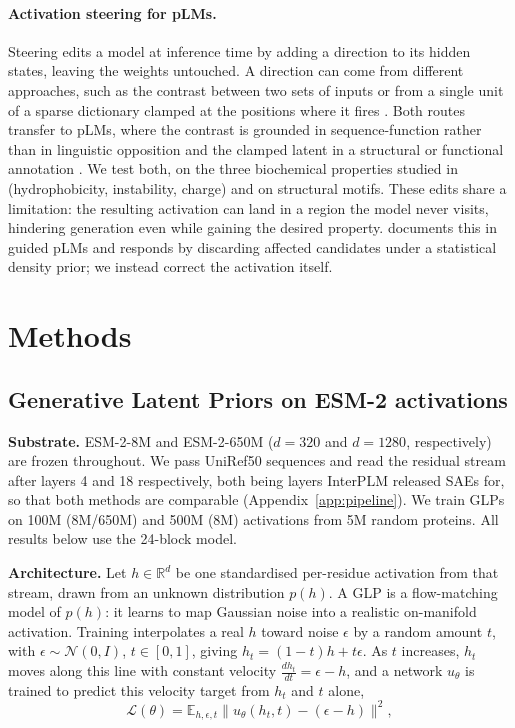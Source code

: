 \documentclass{article}
\begin{document}
\paragraph{Activation steering for pLMs.}
Steering edits a model at inference time by adding a direction to its hidden
states, leaving the weights untouched. A direction can come from different approaches, such as the contrast between two sets of inputs \cite{turner2023actadd,rimsky2024caa,wu2025axbench} or from a
single unit of a sparse dictionary clamped at the positions where it fires
\cite{templeton2024scaling}. Both routes transfer to pLMs, where the contrast is
grounded in sequence-function rather than in linguistic opposition
\cite{huang2025diffmean} and the clamped latent in a structural or functional
annotation \cite{villegas2025plmsae}. We test both, on the three biochemical
properties studied in \cite{banerjee2025labelling} (hydrophobicity, instability, charge) and on structural motifs. These edits share a limitation: the resulting activation can land in a region the model never visits, hindering generation even while gaining the desired property. \cite{zhang2026offmanifold} documents this in guided pLMs and
responds by discarding affected candidates under a statistical density prior; we instead
correct the activation itself.

\section{Methods}
\subsection{Generative Latent Priors on ESM-2 activations}

\textbf{Substrate.} ESM-2-8M and ESM-2-650M ($d{=}320$ and $d{=}1280$, respectively) are frozen throughout. We pass UniRef50 sequences and read the residual stream after layers 4 and 18 respectively, both being layers InterPLM released SAEs for, so that both methods are comparable
(Appendix~\ref{app:pipeline}). We train GLPs on 100M (8M/650M) and 500M (8M)  activations from 5M random proteins. All
results below use the 24-block model.


\textbf{Architecture.} Let $h \in \mathbb{R}^{d}$ be one standardised per-residue activation
from that stream, drawn from an unknown distribution $p(h)$. A GLP is a flow-matching model of
$p(h)$: it learns to map Gaussian noise into a realistic on-manifold activation. Training interpolates a
real $h$ toward noise $\epsilon$ by a random amount $t$, with $\epsilon \sim \mathcal{N}(0,I)$, $t \in [0,1]$, giving $h_t = (1-t)h + t\epsilon$. As $t$ increases, $h_t$ moves along this line with
constant velocity $\frac{d h_t}{dt} = \epsilon - h$, and a network $u_\theta$ is trained to
predict this velocity target from $h_t$ and $t$ alone,
\begin{equation}
\mathcal{L}(\theta) = \mathbb{E}_{h,\epsilon,t}\big\lVert u_\theta(h_t,t) - (\epsilon - h) \big\rVert^2 ,
\label{eq:fm}
\end{equation}
\end{document}
